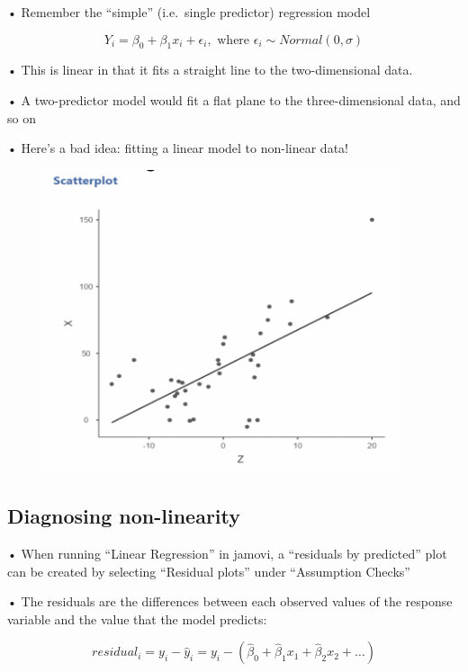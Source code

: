 \documentclass[
  letterpaper,
  DIV=11,
  numbers=noendperiod]{scrreprt}
\begin{document}
• Remember the ``simple'' (i.e.~single predictor) regression model

\[
Y_i = \beta_0 + \beta_1x_{i} + \epsilon_i, \text{ where } \epsilon_i \sim Normal(0,\sigma)
\]

• This is linear in that it fits a straight line to the two-dimensional
data.

• A two-predictor model would fit a flat plane to the three-dimensional
data, and so on

• Here's a bad idea: fitting a linear model to non-linear data!

\begin{figure}

{\centering \includegraphics[width=4.16667in,height=\textheight]{images/mod4_pt1_1.png}

}

\end{figure}

\hypertarget{diagnosing-non-linearity}{%
\subsection{Diagnosing non-linearity}\label{diagnosing-non-linearity}}

• When running ``Linear Regression'' in jamovi, a ``residuals by
predicted'' plot can be created by selecting ``Residual plots'' under
``Assumption Checks''

• The residuals are the differences between each observed values of the
response variable and the value that the model predicts:

\[
residual_i = y_i - \hat{y}_i = y_i - (\hat{\beta}_0 + \hat{\beta}_1x_1 + \hat\beta_2x_2 + \dots)
\]
\end{document}
